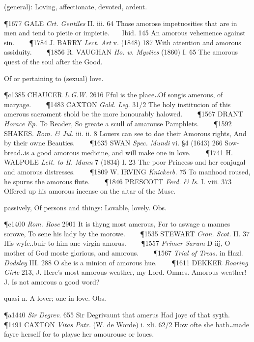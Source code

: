 \begin{description}[wide, labelwidth=!, labelindent=0pt]
\begin{myenumerate}
 (general): Loving, affectionate, devoted, ardent. 

\P 1677 GALE \textit{Crt. Gentiles} II. iii. 64 Those amorose impetuosities that are in men and tend to pietie or impietie.    Ibid. 145 An amorous vehemence against sin.    
\P 1784 J. BARRY \textit{Lect. Art} v. (1848) 187 With attention and amorous assiduity.    
\P 1856 R. VAUGHAN \textit{Ho. w. Mystics} (1860) I. 65 The amorous quest of the soul after the Good.

 Of or pertaining to (sexual) love. 

\P c1385 CHAUCER \textit{L.G.W.} 2616 Fful is the place‥Of songis amerous, of maryage.    
\P 1483 CAXTON \textit{Gold. Leg.} 31/2 The holy institucion of this amerous sacrament shold be the more honourably halowed.    
\P 1567 DRANT \textit{Horace Ep.} To Reader, So greate a scull of amarouse Pamphlets.    
\P 1592 SHAKES. \textit{Rom. \& Jul.} iii. ii. 8 Louers can see to doe their Amorous rights, And by their owne Beauties.    
\P 1635 SWAN \textit{Spec. Mundi} vi. §4 (1643) 266 Sow-bread‥is a good amorous medicine, and will make one in love.    
\P 1741 H. WALPOLE \textit{Lett. to H. Mann} 7 (1834) I. 23 The poor Princess and her conjugal and amorous distresses.    
\P 1809 W. IRVING \textit{Knickerb.} 75 To manhood roused, he spurns the amorous flute.    
\P 1846 PRESCOTT \textit{Ferd. \& Is.} I. viii. 373 Offered up his amorous incense on the altar of the Muse.

 passively, Of persons and things: Lovable, lovely. Obs. 

\P c1400 \textit{Rom. Rose} 2901 It is thyng most amerous, For to aswage a mannes sorowe, To sene his lady by the morowe.    
\P 1535 STEWART \textit{Cron. Scot.} II. 37 His wyfe‥buir to him ane virgin amorus.    
\P 1557 \textit{Primer Sarum} D iij, O mother of God moste glorious, and amorous.    
\P 1567 \textit{Trial of Treas.} in Hazl. \textit{Dodsley} III. 288 O she is a minion of amorous hue.    
\P 1611 DEKKER \textit{Roaring Girle} 213, J. Here's most amorous weather, my Lord. Omnes. Amorous weather! J. Is not amorous a good word?

 quasi-n. A lover; one in love. Obs. 

\P a1440 \textit{Sir Degrev.} 655 Sir Degrivaunt that amerus Had joye of that syȝth.    
\P 1491 CAXTON \textit{Vitas Patr.} (W. de Worde) i. xli. 62/2 How ofte she hath‥made fayre herself for to playse her amourouse or loues.
\end{myenumerate}


\end{description}
